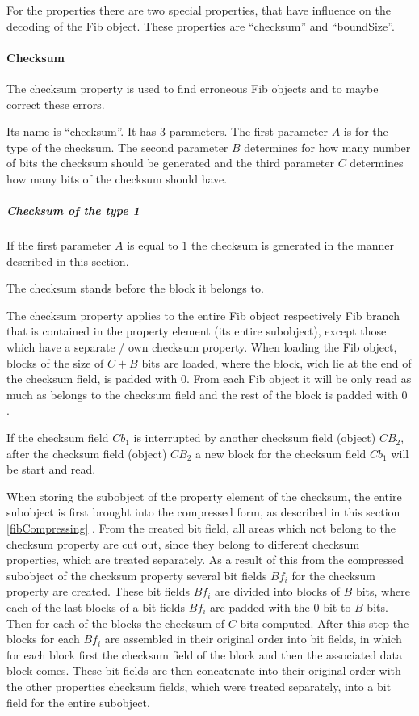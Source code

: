 \bigskip\noindent
For the properties there are two special properties, that have influence on the decoding of the Fib object. These properties are ``checksum'' and ``boundSize''.


\paragraph{Checksum}
\label{secCompressedChecksumm}

The checksum property is used to find erroneous Fib objects and to maybe correct these errors.

Its name is ``checksum''. It has 3 parameters. The first parameter $A$ is for the type of the checksum. The second parameter $B$ determines for how many number of bits the checksum should be generated and the third parameter $C$ determines how many bits of the checksum should have.


\subparagraph{Checksum of the type 1}

If the first parameter $A$ is equal to $1$ the checksum is generated in the manner described in this section.

The checksum stands before the block it belongs to.

The checksum property applies to the entire Fib object respectively Fib branch that is contained in the property element (its entire subobject), except those which have a separate / own checksum property. When loading the Fib object, blocks of the size of $C+B$ bits are loaded, where the block, wich lie at the end of the checksum field, is padded with $0$. From each Fib object it will be only read as much as belongs to the checksum field and the rest of the block is padded with $0$ .

If the checksum field $Cb_1$ is interrupted by another checksum field (object) $CB_2$, after the checksum field (object) $CB_2$ a new block for the checksum field  $Cb_1$ will be start and read.

When storing the subobject of the property element of the checksum, the entire subobject is first brought into the compressed form, as described in this section \ref{fibCompressing} . From the created bit field, all areas which not belong to the checksum property are cut out, since they belong to different checksum properties, which are treated separately. As a result of this from the compressed subobject of the checksum property several bit fields $Bf_i$ for the checksum property are created. These bit fields $Bf_i$ are divided into blocks of $B$ bits, where each of the last blocks of a bit fields $Bf_i$ are padded with the 0 bit to $B$ bits. Then for each of the blocks the checksum of $C$ bits computed. After this step the blocks for each $Bf_i$ are assembled in their original order into bit fields, in which for each block first the checksum field of the block and then the associated data block comes. These bit fields are then concatenate into their original order with the other properties checksum fields, which were treated separately, into a bit field for the entire subobject.

